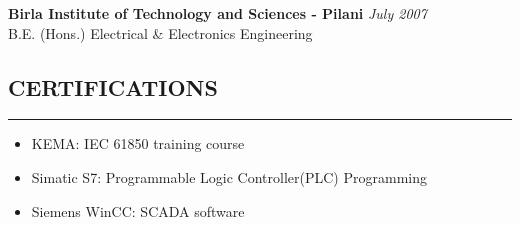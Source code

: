 \documentclass{article}
\begin{document}
    {\bf Birla Institute of Technology and Sciences - Pilani}
    \hfill {\em July 2007} \\ 
    B.E. (Hons.) Electrical \& Electronics Engineering \bigskip \\

%
\subsection*{\MakeUppercase{\bf Certifications}}
    \hrule
    \bigskip
    \begin{itemize}
    \item KEMA: IEC 61850 training course
    \item Simatic S7: Programmable Logic Controller(PLC) Programming
    \item Siemens WinCC: SCADA software
    \end{itemize}
    \bigskip
\end{document}
